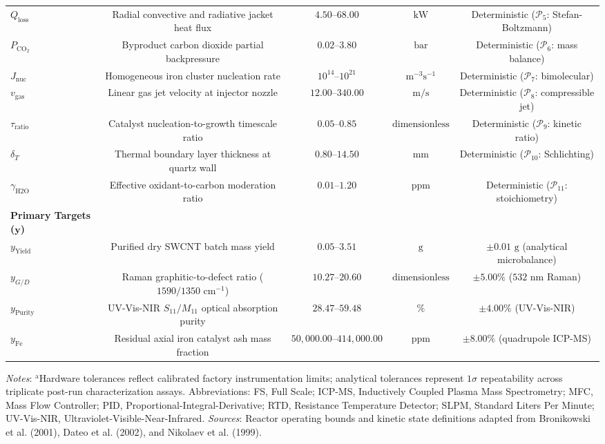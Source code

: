 \documentclass[10pt,journal,onecolumn]{IEEEtran}
\begin{document}
\begin{table}[htbp]
\begin{tabular}{lcccc}
$Q_{\text{loss}}$ & Radial convective and radiative jacket heat flux & $4.50\text{--}68.00$ & $\text{kW}$ & Deterministic ($\mathcal{P}_5$: Stefan-Boltzmann) \\
$P_{\text{CO}_2}$ & Byproduct carbon dioxide partial backpressure & $0.02\text{--}3.80$ & $\text{bar}$ & Deterministic ($\mathcal{P}_6$: mass balance) \\
$J_{\text{nuc}}$ & Homogeneous iron cluster nucleation rate & $10^{14}\text{--}10^{21}$ & $\text{m}^{-3}\text{s}^{-1}$ & Deterministic ($\mathcal{P}_7$: bimolecular) \\
$v_{\text{gas}}$ & Linear gas jet velocity at injector nozzle & $12.00\text{--}340.00$ & $\text{m/s}$ & Deterministic ($\mathcal{P}_8$: compressible jet) \\
$\tau_{\text{ratio}}$ & Catalyst nucleation-to-growth timescale ratio & $0.05\text{--}0.85$ & $\text{dimensionless}$ & Deterministic ($\mathcal{P}_9$: kinetic ratio) \\
$\delta_T$ & Thermal boundary layer thickness at quartz wall & $0.80\text{--}14.50$ & $\text{mm}$ & Deterministic ($\mathcal{P}_{10}$: Schlichting) \\
$\gamma_{\text{H2O}}$ & Effective oxidant-to-carbon moderation ratio & $0.01\text{--}1.20$ & $\text{ppm}$ & Deterministic ($\mathcal{P}_{11}$: stoichiometry) \\
\textbf{Primary Targets ($\mathbf{y}$)} &  &  &  &  \\
$y_{\text{Yield}}$ & Purified dry SWCNT batch mass yield & $0.05\text{--}3.51$ & $\text{g}$ & $\pm 0.01\text{ g}$ (analytical microbalance) \\
$y_{G/D}$ & Raman graphitic-to-defect ratio ($1590/1350\text{ cm}^{-1}$) & $10.27\text{--}20.60$ & $\text{dimensionless}$ & $\pm 5.00\%$ ($532\text{ nm}$ Raman) \\
$y_{\text{Purity}}$ & UV-Vis-NIR $S_{11}/M_{11}$ optical absorption purity & $28.47\text{--}59.48$ & $\%$ & $\pm 4.00\%$ (UV-Vis-NIR) \\
$y_{\text{Fe}}$ & Residual axial iron catalyst ash mass fraction & $50,000.00\text{--}414,000.00$ & $\text{ppm}$ & $\pm 8.00\%$ (quadrupole ICP-MS) \\
\bottomrule\end{tabular}\end{table}
\textit{Notes}: $^{\text{a}}$Hardware tolerances reflect calibrated factory instrumentation limits; analytical tolerances represent $1\sigma$ repeatability across triplicate post-run characterization assays. Abbreviations: FS, Full Scale; ICP-MS, Inductively Coupled Plasma Mass Spectrometry; MFC, Mass Flow Controller; PID, Proportional-Integral-Derivative; RTD, Resistance Temperature Detector; SLPM, Standard Liters Per Minute; UV-Vis-NIR, Ultraviolet-Visible-Near-Infrared. \textit{Sources}: Reactor operating bounds and kinetic state definitions adapted from Bronikowski et al. (2001), Dateo et al. (2002), and Nikolaev et al. (1999).
\end{document}
